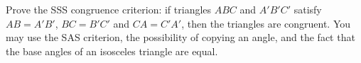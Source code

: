 Prove the SSS congruence criterion: if triangles $ABC$ and $A'B'C'$ satisfy $AB=A'B'$, $BC=B'C'$ and $CA=C'A'$, then the triangles are congruent. You may use the SAS criterion, the possibility of copying an angle, and the fact that the base angles of an isosceles triangle are equal.

